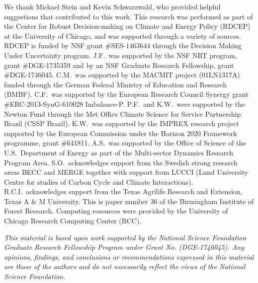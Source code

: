 \documentclass[gmd, manuscript]{copernicus} %
\begin{document}



\begin{acknowledgements}
We thank Michael Stein and Kevin Schwarzwald, who provided helpful suggestions that contributed to this work. 
This research was performed as part of the Center for Robust Decision-making on Climate and Energy Policy (RDCEP) at the University of Chicago, and was supported through a variety of sources. 
RDCEP is funded by NSF grant \#SES-1463644 through the Decision Making Under Uncertainty program. 
J.F.\ was supported by the NSF NRT program, grant \#DGE-1735359 and by an NSF Graduate Research Fellowship, grant \#DGE-1746045. 
C.M.\ was supported by the MACMIT project (01LN1317A) funded through the German Federal Ministry of Education and Research (BMBF). 
C.F.\ was supported by the European Research Council Synergy grant \#ERC-2013-SynG-610028 Imbalance-P. 
P.F.\ and K.W.\ were supported  by the Newton Fund through the Met Office Climate Science for Service Partnership Brazil (CSSP Brazil). 
K.W.\ was supported by the IMPREX research project supported by the European Commission under the Horizon 2020 Framework programme, grant \#641811. 
A.S.\ was supported by the Office of Science of the U.S.\ Department of Energy as part of the Multi-sector Dynamics Research Program Area. 
S.O.\ acknowledges support from the Swedish strong research areas BECC and MERGE together with support from LUCCI (Lund University Centre for studies of Carbon Cycle and Climate Interactions). 
R.C.I.\ acknowledges support from the Texas Agrilife Research and Extension, Texas A \& M University. 
This is paper number 36 of the Birmingham Institute of Forest Research. 
Computing resources were provided by the University of Chicago Research Computing Center (RCC).

\smallskip
\textit{This material is based upon work supported by the National Science Foundation Graduate Research Fellowship Program under Grant No. (DGE-1746045). 
Any opinions, findings, and conclusions or recommendations expressed in this material are those of the authors and do not necessarily reflect the views of the National Science Foundation.}
\end{acknowledgements}



\end{document}
